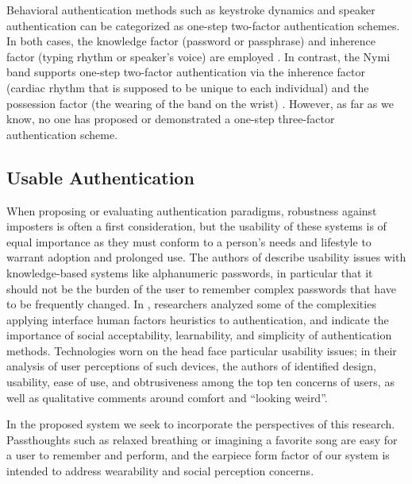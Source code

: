 \documentclass[a4paper,twoside]{article}
\begin{document}
Behavioral authentication methods such as keystroke dynamics and speaker authentication can be categorized as one-step two-factor authentication schemes. In both cases, the knowledge factor (password or passphrase) and inherence factor (typing rhythm or speaker's voice) are employed \cite{Monrose1997}. In contrast, the Nymi band supports one-step two-factor authentication via the inherence factor (cardiac rhythm that is supposed to be unique to each individual) and the possession factor (the wearing of the band on the wrist) \cite{Nymi}. However, as far as we know, no one has proposed or demonstrated a one-step three-factor authentication scheme.

\subsection{Usable Authentication}

\noindent When proposing or evaluating authentication paradigms, robustness against imposters is often a first consideration, but the usability of these systems is of equal importance as they must conform to a person's needs and lifestyle to warrant adoption and prolonged use. The authors of \cite{sasse2001} describe usability issues with knowledge-based systems like alphanumeric passwords, in particular that it should not be the burden of the user to remember complex passwords that have to be frequently changed. In \cite{braz2006}, researchers analyzed some of the complexities applying interface human factors heuristics to authentication, and indicate the importance of social acceptability, learnability, and simplicity of authentication methods. Technologies worn on the head face particular usability issues; in their analysis of user perceptions of such devices, the authors of \cite{Genaro2014} identified design, usability, ease of use, and obtrusiveness among the top ten concerns of users, as well as qualitative comments around comfort and ``looking weird''.

In the proposed system we seek to incorporate the perspectives of this research. Passthoughts such as relaxed breathing or imagining a favorite song are easy for a user to remember and perform, and the earpiece form factor of our system is intended to address wearability and social perception concerns.
\end{document}
